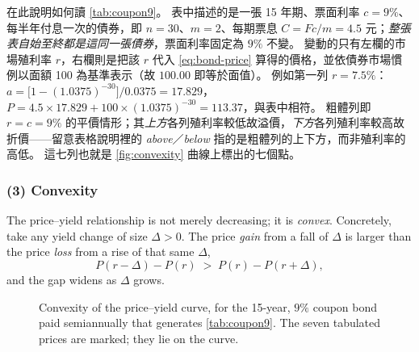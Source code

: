 \begin{remark}
	在此說明如何讀 \autoref{tab:coupon9}。
	表中描述的是一張 15 年期、票面利率 $c = 9\%$、每半年付息一次的債券，即 $n = 30$、$m = 2$、每期票息 $C = Fc/m = 4.5$ 元；\emph{整張表自始至終都是這同一張債券}，票面利率固定為 $9\%$ 不變。
	變動的只有左欄的市場殖利率 $r$，右欄則是把該 $r$ 代入 \eqref{eq:bond-price} 算得的價格，並依債券市場慣例以面額 100 為基準表示（故 $100.00$ 即等於面值）。
	例如第一列 $r = 7.5\%$：$a = \bigl[1-(1.0375)^{-30}\bigr]\big/0.0375 = 17.829$，$P = 4.5 \times 17.829 + 100 \times (1.0375)^{-30} = 113.37$，與表中相符。
	粗體列即 $r = c = 9\%$ 的平價情形；其\emph{上方}各列殖利率較低故溢價，\emph{下方}各列殖利率較高故折價——留意表格說明裡的 \emph{above}／\emph{below} 指的是粗體列的上下方，而非殖利率的高低。
	這七列也就是 \autoref{fig:convexity} 曲線上標出的七個點。
\end{remark}
\suppend

\subsubsection*{(3) Convexity}

\suppstart
The price--yield relationship is not merely decreasing; it is \emph{convex}.
Concretely, take any yield change of size $\Delta > 0$.
The price \emph{gain} from a fall of $\Delta$ is larger than the price \emph{loss} from a rise of that same $\Delta$,
\[
	P(r-\Delta) - P(r) \;>\; P(r) - P(r+\Delta) ,
\]
and the gap widens as $\Delta$ grows.
\suppend

\begin{figure}[H]
	\centering
	\caption{Convexity of the price--yield curve, for the 15-year, $9\%$ coupon
		bond paid semiannually that generates \autoref{tab:coupon9}. The seven
		tabulated prices are marked; they lie on the curve.}
	\label{fig:convexity}
\end{figure}

